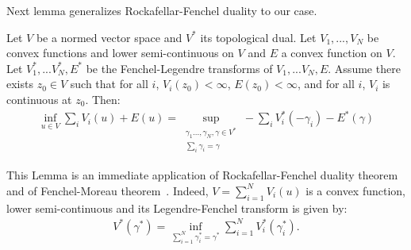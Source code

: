 Next lemma generalizes Rockafellar-Fenchel duality to our case.
\begin{lemma}
\label{lem:rockafellar-gene}
Let $V$ be a normed vector space and $V^*$ its topological dual. Let $V_1,...,V_N$ be convex functions and lower semi-continuous on $V$ and $E$ a convex function on $V$. Let $V^*_1,...V^*_N,E^*$ be the Fenchel-Legendre transforms of $V_1,...V_N,E$. Assume there exists $z_0\in V$ such that for all $i$, $V_i(z_0)<\infty$, $E(z_0)<\infty$, and for all $i$, $V_i$ is continuous at $z_0$. Then:
\begin{align*}
\inf_{u\in V} \sum_i V_i(u) + E(u) = \sup\limits_{\substack{\gamma_1...,\gamma_N,\gamma\in V^*\\\sum_i \gamma_i = \gamma}}-\sum_i V^*_i(-\gamma_i)-E^*(\gamma)
\end{align*}
\end{lemma}
\begin{prv*}
This Lemma is an immediate application of Rockafellar-Fenchel duality theorem~\citep[Theorem 1.12]{brezis2010functional} and of Fenchel-Moreau theorem~\citep[Theorem 1.11]{brezis2010functional}. 
Indeed, $V = \sum\limits_{i=1}^N V_i(u)$ is a convex function, lower semi-continuous and its Legendre-Fenchel transform is given by:
\begin{align}
    V^{*}(\gamma^*)=\inf_{\sum\limits_{i=1}^N \gamma_{i}^*=\gamma^*}\sum_{i=1}^N V_i^{*}(\gamma_{i}^*).
\end{align}
\end{prv*}




